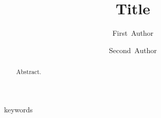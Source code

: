 	\begin{frontmatter}
		
		\title{Title}
		
		\author[address1]{First~Author}
		
		\author[address2]{Second~Author}
		
		\address[address1]{Address 1}
		\address[address2]{Address 2}
		
%		
		
		\begin{abstract}
			Abstract. 					
		\end{abstract}
		
		\begin{keyword}
			keywords
		\end{keyword}
		
	\end{frontmatter}

	
	
